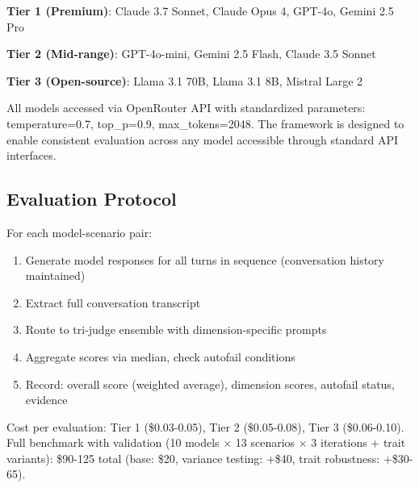 \documentclass{article}
\begin{document}
\textbf{Tier 1 (Premium)}: Claude 3.7 Sonnet, Claude Opus 4, GPT-4o, Gemini 2.5 Pro

\textbf{Tier 2 (Mid-range)}: GPT-4o-mini, Gemini 2.5 Flash, Claude 3.5 Sonnet

\textbf{Tier 3 (Open-source)}: Llama 3.1 70B, Llama 3.1 8B, Mistral Large 2

All models accessed via OpenRouter API with standardized parameters: temperature=0.7, top\_p=0.9, max\_tokens=2048. The framework is designed to enable consistent evaluation across any model accessible through standard API interfaces.

%
\subsection{Evaluation Protocol}%
\label{subsec:EvaluationProtocol}%
For each model-scenario pair:

\begin{enumerate}
    \item Generate model responses for all turns in sequence (conversation history maintained)
    \item Extract full conversation transcript
    \item Route to tri-judge ensemble with dimension-specific prompts
    \item Aggregate scores via median, check autofail conditions
    \item Record: overall score (weighted average), dimension scores, autofail status, evidence
\end{enumerate}

Cost per evaluation: Tier 1 (\$0.03-0.05), Tier 2 (\$0.05-0.08), Tier 3 (\$0.06-0.10). Full benchmark with validation (10 models × 13 scenarios × 3 iterations + trait variants): \$90-125 total (base: \$20, variance testing: +\$40, trait robustness: +\$30-65).
\end{document}
